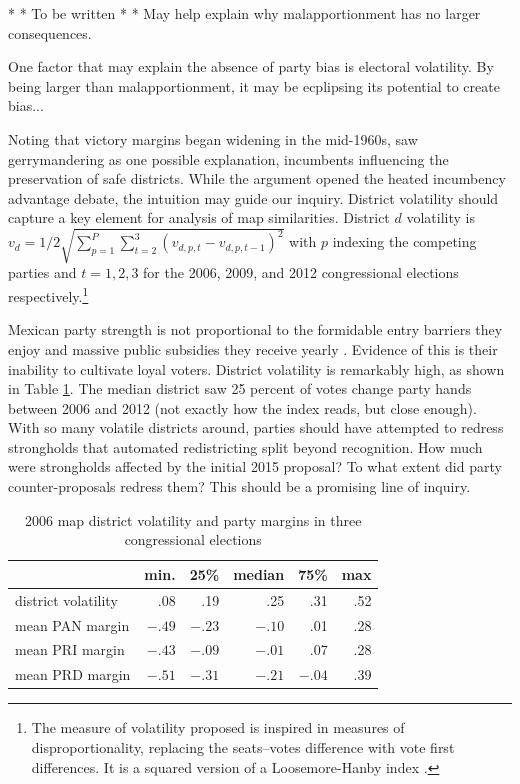 \documentclass[letter,12pt]{article}
\begin{document}
* * To be written * * May help explain why malapportionment has no larger consequences. 

One factor that may explain the absence of party bias is electoral volatility. By being larger than malapportionment, it may be ecplipsing its potential to create bias...

Noting that victory margins began widening in the mid-1960s, \citet{mayhew1974vanishingMg} saw gerrymandering as one possible explanation, incumbents influencing the preservation of safe districts. While the argument opened the heated incumbency advantage debate, the intuition may guide our inquiry. District volatility should capture a key element for analysis of map similarities. District $d$ volatility is $v_d = 1/2 \sqrt{ \sum_{p=1}^P \sum_{t=2}^3 (v_{d,p,t}- v_{d,p,t-1})^2 }$ with $p$ indexing the competing parties and $t=1,2,3$ for the 2006,  2009, and 2012 congressional elections respectively.\footnote{The measure of volatility proposed is inspired in measures of disproportionality, replacing the seats--votes difference with vote first differences. It is a squared version of a Loosemore-Hanby index \citep{loosemore.hanbyDisproportionality1971,gallagherDisproportionality1991}.} 

Mexican party strength is not proportional to the formidable entry barriers they enjoy and massive public subsidies they receive yearly \citep{magar.2007ref.2015}. Evidence of this is their inability to cultivate loyal voters. District volatility is remarkably high, as shown in Table \ref{T:volatMarginsd0}. The median district saw 25 percent of votes change party hands between 2006 and 2012 (not exactly how the index reads, but close enough). With so many volatile districts around, parties should have attempted to redress strongholds that automated redistricting split beyond recognition. How much were strongholds affected by the initial 2015 proposal? To what extent did party counter-proposals redress them? This should be a promising line of inquiry. 

\begin{table}
\begin{center}
\begin{tabular}{lrrrrr}
                    &  min.   &  25\%   & median  & 75\%   & max \\ \hline
district volatility &  .08    & .19     & .25     & .31    & .52 \\
mean PAN margin     &  $-.49$ & $-.23$  & $-.10$  & .01    & .28 \\   
mean PRI margin     &  $-.43$ & $-.09$  & $-.01$  & .07    & .28 \\   
mean PRD margin     &  $-.51$ & $-.31$  & $-.21$  & $-.04$ & .39 \\
\end{tabular}
\caption{2006 map district volatility and party margins in three congressional elections}\label{T:volatMarginsd0}
\end{center}
\end{table}
\end{document}
